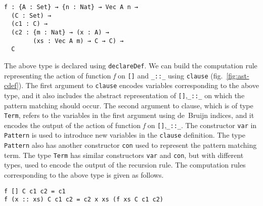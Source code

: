 \documentclass[sigplan,10pt]{acmart}
\begin{document}
\begin{center}
\begingroup
\begin{BVerbatim}
f : {A : Set} → {n : Nat} → Vec A n → 
  (C : Set) → 
  (c1 : C) → 
  (c2 : {m : Nat} → (x : A) → 
        (xs : Vec A m) → C → C) → 
  C
\end{BVerbatim}
\endgroup
\end{center}

\normalsize


The above type is declared using {\tt declareDef}. We can build the computation rule representing the action of function \emph{f} on {\tt []} and {\tt \_::\_} using {\tt clause} (fig.~\ref{fig:ast-cdef}). The first argument to {\tt clause} encodes variables corresponding to the above type, and it also includes the abstract representation of {\tt []},{\tt \_::\_} on which the pattern matching should occur. The second argument to clause, which is of type {\tt Term}, refers to the variables in the first argument using de~Bruijn indices, and it encodes the output of the action of function \emph{f} on {\tt []},{\tt \_::\_}. The constructor {\tt var} in {\tt Pattern} is used to introduce new variables in the {\tt clause} definition. The type {\tt Pattern} also has another constructor {\tt con} used to represent the pattern matching term. The type {\tt Term} has similar constructors {\tt var} and {\tt con}, but with different types, used to encode the output of the recursion rule. The computation rules corresponding to the above type is given as follows.

\begin{center}
\begingroup
\begin{BVerbatim}
f [] C c1 c2 = c1
f (x :: xs) C c1 c2 = c2 x xs (f xs C c1 c2)
\end{BVerbatim}
\endgroup
\end{center}
\end{document}
